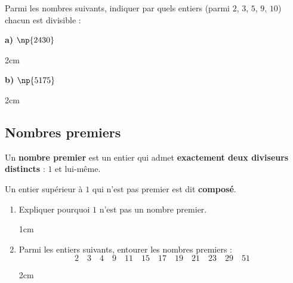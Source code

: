 \documentclass[a4paper]{book}
\begin{document}
    \begin{exemple}
        Parmi les nombres suivants, indiquer par quels entiers (parmi $2$, $3$, $5$, $9$, $10$) chacun est divisible :
        
        \medskip
        \noindent
        \begin{minipage}[t]{0.45\textwidth}
            \textbf{a)} $\np{2430}$
            \begin{ZoneReponse}{2cm}
            \end{ZoneReponse}
        \end{minipage}
        \hfill
        \begin{minipage}[t]{0.45\textwidth}
            \textbf{b)} $\np{5175}$
            \begin{ZoneReponse}{2cm}
            \end{ZoneReponse}
        \end{minipage}
    \end{exemple}


\subsection{Nombres premiers}

    \begin{definition}
        Un \textbf{nombre premier} est un entier qui admet \textbf{exactement deux diviseurs distincts} : $1$ et lui-même.
        
        \medskip
        Un entier supérieur à $1$ qui n'est pas premier est dit \textbf{composé}.
    \end{definition}

    \begin{exemple}
        \begin{enumerate}
            \item Expliquer pourquoi $1$ n'est pas un nombre premier.
            \begin{ZoneReponse}{1cm}
            \end{ZoneReponse}

            \item Parmi les entiers suivants, entourer les nombres premiers :
            \[
                2 \quad 3 \quad 4 \quad 9 \quad 11 \quad 15 \quad 17 \quad 19 \quad 21 \quad 23 \quad 29 \quad 51
            \]
            \begin{ZoneReponse}{2cm}
            \end{ZoneReponse}
        \end{enumerate}
    \end{exemple}
\end{document}
